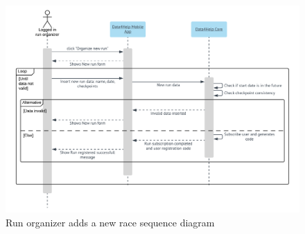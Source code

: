 \begin{figure}[H]
  \includegraphics[width=\textwidth,height=\textheight,keepaspectratio]{assets/sequence/RunOrganizerAddsANewRace.pdf}
  \caption{Run organizer adds a new race sequence diagram}
  \label{fig:RunOrganizerAddsANewRace}
\end{figure}









\newpage
